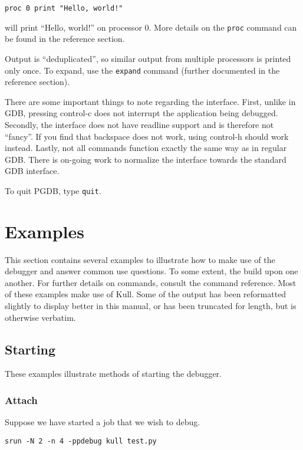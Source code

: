 \documentclass{refart}
\begin{document}
\begin{Verbatim}
proc 0 print "Hello, world!"
\end{Verbatim}

will print ``Hello, world!'' on processor 0. More details on the \texttt{proc} command can be found in the reference section.

Output is ``deduplicated'', so similar output from multiple processors is printed only once. To expand, use the \texttt{expand} command (further documented in the reference section).

There are some important things to note regarding the interface. First, unlike in GDB, pressing control-c does not interrupt the application being debugged. Secondly, the interface does not have readline support and is therefore not ``fancy''. If you find that backspace does not work, using control-h should work instead. Lastly, not all commands function exactly the same way as in regular GDB. There is on-going work to normalize the interface towards the standard GDB interface.

To quit PGDB, type \texttt{quit}.

\newpage

\section{Examples}

This section contains several examples to illustrate how to make use of the debugger and answer common use questions. To some extent, the build upon one another. For further details on commands, consult the command reference. Most of these examples make use of Kull. Some of the output has been reformatted slightly to display better in this manual, or has been truncated for length, but is otherwise verbatim.

\subsection{Starting}

These examples illustrate methods of starting the debugger.

\subsubsection{Attach}

Suppose we have started a job that we wish to debug.

\begin{Verbatim}
srun -N 2 -n 4 -ppdebug kull test.py
\end{Verbatim}
\end{document}
